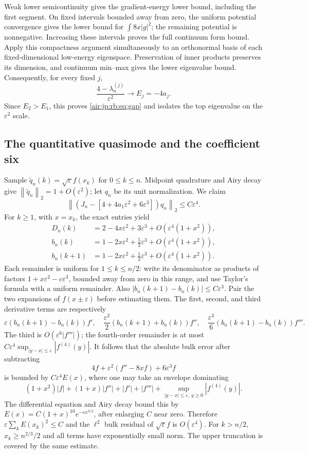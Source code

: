 \documentclass[11pt,letterpaper]{article}
\numberwithin{equation}{section}
\theoremstyle{remark}
\newcommand{\norm}[1]{\left\lVert#1\right\rVert}
\newcommand{\eps}{\varepsilon}
\begin{document}
Weak lower semicontinuity gives the gradient-energy lower bound, including the first segment. On fixed intervals bounded away from zero, the uniform potential convergence gives the lower bound for $\int8x|g|^2$; the remaining potential is nonnegative. Increasing these intervals proves the full continuum form bound. Apply this compactness argument simultaneously to an orthonormal basis of each fixed-dimensional low-energy eigenspace. Preservation of inner products preserves its dimension, and continuum min--max gives the lower eigenvalue bound. Consequently, for every fixed $j$,
\begin{equation}\label{air:jp:rb:eq:spectral-limit}
 \frac{4-\lambda_n^{(j)}}{\eps^2}\longrightarrow E_j=-4a_j.
\end{equation}
Since $E_2>E_1$, this proves \eqref{air:jp:rb:eq:gap} and isolates the top eigenvalue on the $\eps^2$ scale.

\subsection{The quantitative quasimode and the coefficient six}
Sample $\widetilde q_n(k)=\sqrt\eps f(x_k)$ for $0\le k\le n$. Midpoint quadrature and Airy decay give
$\norm{\widetilde q_n}_2=1+O(\eps^2)$; let $q_n$ be its unit normalization. We claim
\begin{equation}\label{air:jp:rb:eq:residual}
 \norm{(J_n-[4+4a_1\eps^2+6\eps^3])q_n}_2\le C\eps^4.
\end{equation}
For $k\ge1$, with $x=x_k$, the exact entries yield
\begin{align}
 D_n(k)&=2-4x\eps^2+3\eps^3+O(\eps^4(1+x^2)),\\
 b_n(k)&=1-2x\eps^2+\tfrac52\eps^3+O(\eps^4(1+x^2)),\\
 b_n(k+1)&=1-2x\eps^2+\tfrac12\eps^3+O(\eps^4(1+x^2)).
\end{align}
Each remainder is uniform for $1\le k\le n/2$: write its denominator as products of factors $1+x\eps^2-c\eps^3$, bounded away from zero in this range, and use Taylor's formula with a uniform remainder. Also
$|b_n(k+1)-b_n(k)|\le C\eps^3$.
Pair the two expansions of $f(x\pm\eps)$ before estimating them. The first, second, and third derivative terms are respectively
\[
 \eps(b_n(k+1)-b_n(k))f',\quad
 \frac{\eps^2}2(b_n(k+1)+b_n(k))f'',\quad
 \frac{\eps^3}6(b_n(k+1)-b_n(k))f'''.
\]
The third is $O(\eps^6|f'''|)$; the fourth-order remainder is at most $C\eps^4\sup_{|y-x|\le\eps}|f^{(4)}(y)|$. It follows that the absolute bulk error after subtracting
\[
 4f+\eps^2(f''-8xf)+6\eps^3f
\]
is bounded by $C\eps^4E(x)$, where one may take an envelope dominating
\[
 (1+x^2)|f|+(1+x)|f''|+|f'|+|f'''|
 +\sup_{|y-x|\le\eps,\ y\ge0}|f^{(4)}(y)|.
\]
The differential equation and Airy decay bound this by
$E(x)=C(1+x)^{10}e^{-cx^{3/2}}$, after enlarging $C$ near zero.
Therefore $\eps\sum_kE(x_k)^2\le C$ and the $\ell^2$ bulk residual of $\sqrt\eps f$ is $O(\eps^4)$.
For $k>n/2$, $x_k\ge n^{2/3}/2$ and all terms have exponentially small norm. The upper truncation is covered by the same estimate.
\end{document}
